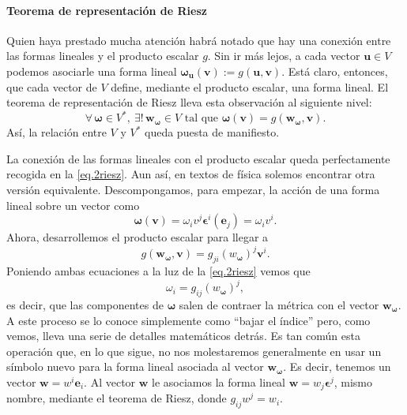 \paragraph{Teorema de representación de Riesz} Quien haya prestado mucha atención habrá notado que hay una conexión entre las formas lineales y el producto escalar \(g\). Sin ir más lejos, a cada vector \(\mathbf{u}\in V\) podemos asociarle una forma lineal \(\boldsymbol{\omega}_\mathbf{u}(\mathbf{v}) := g(\mathbf{u}, \mathbf{v})\). Está claro, entonces, que cada vector de \(V\) define, mediante el producto escalar, una forma lineal. El teorema de representación de Riesz lleva esta observación al siguiente nivel: 
\begin{equation}
    \label{eq.2riesz}
    \forall\, \boldsymbol{\omega}\in V^*,\ \exists!\, \mathbf{w}_{\boldsymbol{\omega}}\in V
    \text{ tal que }
    \boldsymbol{\omega}(\mathbf{v}) = g(\mathbf{w}_{\boldsymbol{\omega}},\mathbf{v}). 
\end{equation}
Así, la relación entre \(V\) y \(V^*\) queda puesta de manifiesto. 

La conexión de las formas lineales con el producto escalar queda perfectamente recogida en la \cref{eq.2riesz}. Aun así, en textos de física solemos encontrar otra versión equivalente. Descompongamos, para empezar, la acción de una forma lineal sobre un vector como
\begin{equation*}
    \boldsymbol{\omega}(\mathbf{v}) = \omega_i v^j \boldsymbol{\epsilon}^i(\mathbf{e}_j) = \omega_i v^i.
\end{equation*}
Ahora, desarrollemos el producto escalar para llegar a
\begin{equation*}    
    g(\mathbf{w}_{\boldsymbol{\omega}},\mathbf{v}) = 
    g_{ji}(w_{\boldsymbol{\omega}})^j \mathbf{v}^i.
\end{equation*}
Poniendo ambas ecuaciones a la luz de la \cref{eq.2riesz} vemos que 
\begin{equation}
    \omega_i = g_{ij}(w_{\boldsymbol{\omega}})^j,
\end{equation}
es decir, que las componentes de \(\boldsymbol{\omega}\) salen de contraer la métrica con el vector \(\mathbf{w}_{\boldsymbol{\omega}}\). A este proceso se lo conoce simplemente como ``bajar el índice'' pero, como vemos, lleva una serie de detalles matemáticos detrás. Es tan común esta operación que, en lo que sigue, no nos molestaremos generalmente en usar un símbolo nuevo para la forma lineal asociada al vector \(\mathbf{w}_{\boldsymbol{\omega}}\). Es decir, tenemos un vector \(\mathbf{w}=w^i\mathbf{e}_i\). Al vector \(\mathbf{w}\) le asociamos la forma lineal \(\mathbf{w}=w_j \boldsymbol{\epsilon}^j\), mismo nombre, mediante el teorema de Riesz, donde \(g_{ij} w^j = w_i\).

